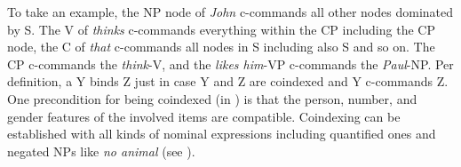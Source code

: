 \documentclass[output=paper
 	        ,biblatex
                ,babelshorthands
                ,newtxmath
                ,draftmode
                ,colorlinks, citecolor=brown
]{langscibook}
\begin{document}
To take an example, the NP node of \emph{John} c-commands all other nodes dominated by S. The V of
\emph{thinks} c-commands everything within the CP including the CP node, the C of \emph{that}
c-commands all nodes in S including also S and so on. The CP c-commands the \emph{think}-V, and the
\emph{likes him}-VP c-commands the \emph{Paul}-NP. Per definition, a Y binds Z just in case Y and Z
are coindexed and Y c-commands Z. One precondition for being coindexed (in ) is that the
person, number, and gender features of the involved items are compatible. Coindexing can be
established with all kinds of nominal expressions including quantified ones and negated NPs like
\emph{no animal} (see \citealp[--129]{BP80a}).
\end{document}

